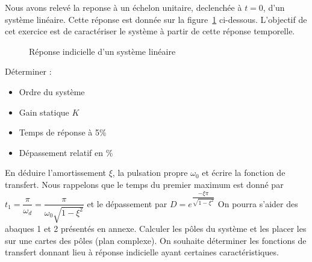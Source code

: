 Nous avons relevé la reponse à un échelon unitaire, 
declenchée à $t=0$, d'un système linéaire.
Cette réponse est donnée sur la figure~\ref{fig-2nd} ci-dessous.
L'objectif de cet exercice est de caractériser le système 
à partir de cette réponse temporelle.
\begin{figure}[!h]
    \centering
    
    \caption{Réponse indicielle d'un système linéaire\label{fig-2nd}}
\end{figure}
\question{}
Déterminer :
\begin{itemize}
    \item Ordre du système
    \item Gain statique $K$
    \item Temps de réponse à 5\%
    \item Dépassement relatif en \%
\end{itemize}
\question{}
En déduire l'amortissement $\xi$, la pulsation propre $\omega_0$ et écrire 
la fonction de transfert. Nous rappelons que le temps du premier maximum est 
donné par $t_1=\dfrac{\pi}{\omega_d}=\dfrac{\pi}{\omega_0\sqrt{1-\xi^2}}$
et le dépassement par $D=e^{\dfrac{-\xi\pi}{\sqrt{1-\xi^2}}}$
On pourra s'aider des abaques 1 et 2 présentés en annexe.
\question{}
Calculer les pôles du système et les placer les sur une cartes des 
pôles (plan complexe).
On souhaite déterminer les fonctions de transfert donnant lieu à réponse 
indicielle ayant certaines caractéristiques.


